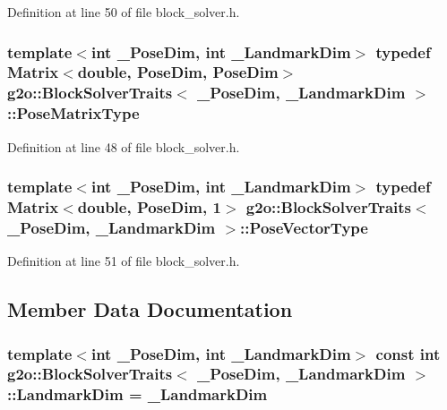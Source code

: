 Definition at line 50 of file block\+\_\+solver.\+h.

\subsubsection[{\texorpdfstring{Pose\+Matrix\+Type}{PoseMatrixType}}]{\setlength{\rightskip}{0pt plus 5cm}template$<$int \+\_\+\+Pose\+Dim, int \+\_\+\+Landmark\+Dim$>$ typedef Matrix$<$double, {\bf Pose\+Dim}, {\bf Pose\+Dim}$>$ {\bf g2o\+::\+Block\+Solver\+Traits}$<$ \+\_\+\+Pose\+Dim, \+\_\+\+Landmark\+Dim $>$\+::{\bf Pose\+Matrix\+Type}}\hypertarget{structg2o_1_1BlockSolverTraits_a35e6e4bad138dcfcaa3b1339e168bf30}{}\label{structg2o_1_1BlockSolverTraits_a35e6e4bad138dcfcaa3b1339e168bf30}


Definition at line 48 of file block\+\_\+solver.\+h.

\subsubsection[{\texorpdfstring{Pose\+Vector\+Type}{PoseVectorType}}]{\setlength{\rightskip}{0pt plus 5cm}template$<$int \+\_\+\+Pose\+Dim, int \+\_\+\+Landmark\+Dim$>$ typedef Matrix$<$double, {\bf Pose\+Dim}, 1$>$ {\bf g2o\+::\+Block\+Solver\+Traits}$<$ \+\_\+\+Pose\+Dim, \+\_\+\+Landmark\+Dim $>$\+::{\bf Pose\+Vector\+Type}}\hypertarget{structg2o_1_1BlockSolverTraits_a032ed57e9bc44c36093f97b32e1506f6}{}\label{structg2o_1_1BlockSolverTraits_a032ed57e9bc44c36093f97b32e1506f6}


Definition at line 51 of file block\+\_\+solver.\+h.



\subsection{Member Data Documentation}
\subsubsection[{\texorpdfstring{Landmark\+Dim}{LandmarkDim}}]{\setlength{\rightskip}{0pt plus 5cm}template$<$int \+\_\+\+Pose\+Dim, int \+\_\+\+Landmark\+Dim$>$ const int {\bf g2o\+::\+Block\+Solver\+Traits}$<$ \+\_\+\+Pose\+Dim, \+\_\+\+Landmark\+Dim $>$\+::Landmark\+Dim = \+\_\+\+Landmark\+Dim\hspace{0.3cm}{\ttfamily [static]}}\hypertarget{structg2o_1_1BlockSolverTraits_a7e6e33971e5243e020a9f41cd3182218}{}\label{structg2o_1_1BlockSolverTraits_a7e6e33971e5243e020a9f41cd3182218}


